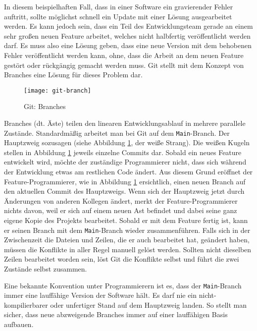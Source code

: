 In diesem beispielhaften Fall, dass in einer Software ein gravierender Fehler
auftritt, sollte möglichst schnell ein Update mit einer Lösung ausgearbeitet
werden. Es kann jedoch sein, dass ein Teil des Entwicklungsteam gerade an einem
sehr großen neuen Feature arbeitet, welches nicht halbfertig veröffentlicht
werden darf. Es muss also eine Lösung geben, dass eine neue Version mit dem
behobenen Fehler veröffentlicht werden kann, ohne, dass die Arbeit an dem neuen
Feature gestört oder rückgängig gemacht werden muss. Git stellt mit dem Konzept
von Branches eine Lösung für dieses Problem dar.

\begin{figure}[h]
    \centering
    \texttt{[image: git-branch]}
    \caption{Git: Branches}
    \label{fig:git-branch}
\end{figure}

Branches (dt. Äste) teilen den linearen Entwicklungsablauf in mehrere parallele
Zustände. Standardmäßig arbeitet man bei Git auf dem \texttt{Main}-Branch. Der
Hauptzweig sozusagen (siehe Abbildung \ref{fig:git-branch}, der weiße Strang).
Die weißen Kugeln stellen in Abbildung \ref{fig:git-branch} jeweils einzelne
Commits dar. Sobald ein neues Feature entwickelt wird, möchte der zuständige
Programmierer nicht, dass sich während der Entwicklung etwas am
restlichen Code ändert. Aus diesem Grund eröffnet der Feature-Programmierer, wie
in Abbildung \ref{fig:git-branch} ersichtlich, einen neuen Branch auf den
aktuellen Commit des Hauptzweigs. Wenn sich der Hauptzweig jetzt durch
Änderungen von anderen Kollegen ändert, merkt der Feature-Programmierer nichts
davon, weil er sich auf einem neuen Ast befindet und dabei seine ganz eigene
Kopie des Projekts bearbeitet. Sobald er mit dem Feature fertig ist, kann er
seinen Branch mit dem \texttt{Main}-Branch wieder zusammenführen. Falls sich in
der Zwischenzeit die Dateien und Zeilen, die er auch bearbeitet hat, geändert
haben, müssen die Konflikte in aller Regel manuell gelöst werden. Sollten nicht
dieselben Zeilen bearbeitet worden sein, löst Git die Konflikte selbst und führt
die zwei Zustände selbst zusammen.

Eine bekannte Konvention unter Programmierern ist es, dass der
\texttt{Main}-Branch immer eine lauffähige Version der Software hält. Es darf
nie ein nicht-kompilierbarer oder unfertiger Stand auf dem Hauptzweig landen.
So stellt man sicher, dass neue abzweigende Branches immer auf einer
lauffähigen Basis aufbauen.


